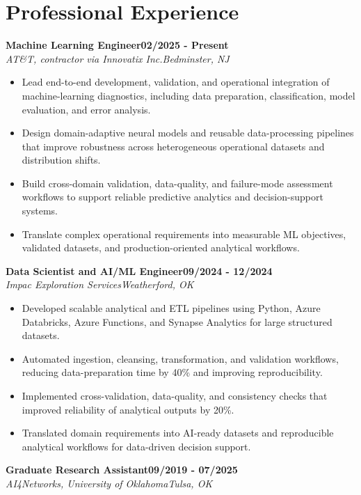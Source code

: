 \documentclass[9pt,letterpaper]{extarticle}
\newcommand{\role}[4]{%
  \Needspace{4\baselineskip}\textbf{#1}\hfill\textbf{#2}\\[-1pt]
  \textit{#3}\hfill\textit{#4}\par}
\begin{document}
\section{Professional Experience}
\role{Machine Learning Engineer}{02/2025 - Present}{AT\&T, contractor via Innovatix Inc.}{Bedminster, NJ}
\begin{itemize}
\item Lead end-to-end development, validation, and operational integration of machine-learning diagnostics, including data preparation, classification, model evaluation, and error analysis.
\item Design domain-adaptive neural models and reusable data-processing pipelines that improve robustness across heterogeneous operational datasets and distribution shifts.
\item Build cross-domain validation, data-quality, and failure-mode assessment workflows to support reliable predictive analytics and decision-support systems.
\item Translate complex operational requirements into measurable ML objectives, validated datasets, and production-oriented analytical workflows.
\end{itemize}
\role{Data Scientist and AI/ML Engineer}{09/2024 - 12/2024}{Impac Exploration Services}{Weatherford, OK}
\begin{itemize}
\item Developed scalable analytical and ETL pipelines using Python, Azure Databricks, Azure Functions, and Synapse Analytics for large structured datasets.
\item Automated ingestion, cleansing, transformation, and validation workflows, reducing data-preparation time by 40\% and improving reproducibility.
\item Implemented cross-validation, data-quality, and consistency checks that improved reliability of analytical outputs by 20\%.
\item Translated domain requirements into AI-ready datasets and reproducible analytical workflows for data-driven decision support.
\end{itemize}
\role{Graduate Research Assistant}{09/2019 - 07/2025}{AI4Networks, University of Oklahoma}{Tulsa, OK}
\end{document}
